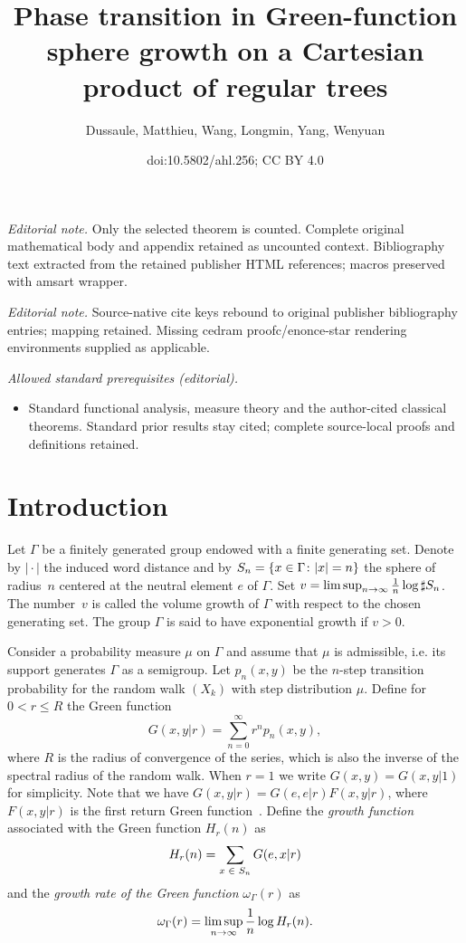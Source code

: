 \documentclass[10pt]{amsart}
\title{Phase transition in Green-function sphere growth on a Cartesian product of regular trees}
\author{Dussaule, Matthieu, Wang, Longmin, Yang, Wenyuan}
\date{doi:10.5802/ahl.256; CC BY 4.0}
\theoremstyle{definition}\newtheorem{defi}[theo]{Definition}\newtheorem{rema}[theo]{Remark}\newtheorem{exam}[theo]{Example}\newtheorem{exem}[theo]{Example}\newtheorem{nota}[theo]{Notation}
\let\originalleft\left
\let\originalright\right
\renewcommand{\left}{\mathopen{}\mathclose\bgroup\originalleft}
\renewcommand{\right}{\aftergroup\egroup\originalright}
\let\oldin\in
\renewcommand{\in}{\mathchoice{\oldin}{\oldin}{\,\oldin\,}{\,\oldin\,}}
\renewcommand*{\to}{\mathchoice{\longrightarrow}{\rightarrow}{\rightarrow}{\rightarrow}}
\begin{document}
\maketitle
\noindent\textit{Editorial note.} Only the selected theorem is counted. Complete original mathematical body and appendix retained as uncounted context. Bibliography text extracted from the retained publisher HTML references; macros preserved with amsart wrapper.\par\medskip
\noindent\textit{Editorial note.} Source-native cite keys rebound to original publisher bibliography entries; mapping retained. Missing cedram proofc/enonce-star rendering environments supplied as applicable.\par\medskip
\noindent\textit{Allowed standard prerequisites (editorial).}\begin{itemize}
\item Standard functional analysis, measure theory and the author-cited classical theorems. Standard prior results stay cited; complete source-local proofs and definitions retained.
\end{itemize}\medskip

\section{Introduction}


Let $\Gamma$ be a finitely generated group endowed with a finite generating set. Denote by $|\!\cdot\!|$ the induced word distance and by $S_n = \left\{ x \in \Gamma \colon |x| =n \right\}$ the sphere of radius~$n$ centered at the neutral element $e$ of $\Gamma$. Set $v=\limsup_{n\to\infty} \frac{1}{n}\log \sharp S_n$. The number~$v$ is called the volume growth of $\Gamma$ with respect to the chosen generating set. The group $\Gamma$ is said to have exponential growth if $v>0$.


Consider a probability measure $\mu$ on $\Gamma$ and assume that $\mu$ is admissible, i.e. its support generates $\Gamma$ as a semigroup. Let $p_n(x, y)$ be the $n$-step transition probability for the random walk $(X_k)$ with step distribution $\mu$. Define for $0 < r \leq R$ the Green function
\[
G(x, y | r) = \sum_{n = 0}^{\infty} r^n p_n(x, y),
\]
where $R$ is the radius of convergence of the series, which is also the inverse of the spectral radius of the random walk. When $r = 1$ we write $G(x, y) = G(x, y | 1)$ for simplicity. Note that we have $G(x, y | r) = G(e, e | r) F(x, y | r)$, where $F(x, y | r)$ is the first return Green function~\cite[Lemma~1.13]{Woessbook}. Define the \emph{growth function} associated with the Green function $H_r(n)$ as
\[
H_r(n) = \sum_{x \in S_n} G(e, x | r)
\]
and the \emph{growth rate of the Green function} $\omega_\Gamma(r)$ as
\[
\omega_{\Gamma}(r) = \limsup_{n \to \infty} \frac{1}{n} \log H_r(n).
\]
\end{document}
